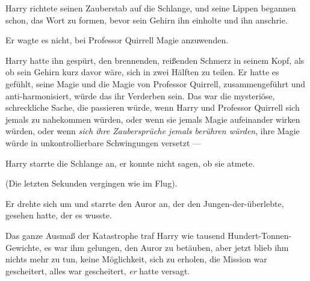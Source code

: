 Harry richtete seinen Zauberstab auf die Schlange, und seine Lippen begannen schon, das Wort  zu formen, bevor sein Gehirn ihn einholte und ihn anschrie.

Er wagte es nicht, bei Professor Quirrell Magie anzuwenden.

Harry hatte ihn gespürt, den brennenden, reißenden Schmerz in seinem Kopf, als ob sein Gehirn kurz davor wäre, sich in zwei Hälften zu teilen. Er hatte es gefühlt, seine Magie und die Magie von Professor Quirrell, zusammengeführt und anti-harmonisiert, würde das ihr Verderben sein. Das war die mysteriöse, schreckliche Sache, die passieren würde, wenn Harry und Professor Quirrell sich jemals zu nahekommen würden, oder wenn sie jemals Magie aufeinander wirken würden, oder wenn \emph{sich ihre Zaubersprüche jemals berühren würden}, ihre Magie würde in unkontrollierbare Schwingungen versetzt —

Harry starrte die Schlange an, er konnte nicht sagen, ob sie atmete.

(Die letzten Sekunden vergingen wie im Flug).

Er drehte sich um und starrte den Auror an, der den Jungen-der-überlebte, gesehen hatte, der es wusste.

Das ganze Ausmaß der Katastrophe traf Harry wie tausend Hundert-Tonnen-Gewichte, es war ihm gelungen, den Auror zu betäuben, aber jetzt blieb ihm nichts mehr zu tun, keine Möglichkeit, sich zu erholen, die Mission war gescheitert, alles war gescheitert, \emph{er} hatte versagt.

